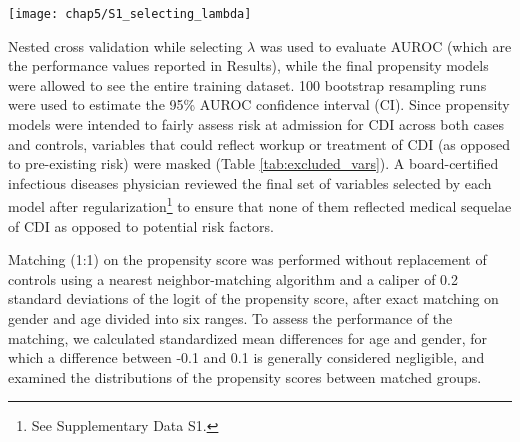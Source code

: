 \begin{figure*}[tbp]
  \centering
  \texttt{[image: chap5/S1\_selecting\_lambda]}
\end{figure*}
Nested cross validation while selecting $\lambda$ was used to evaluate AUROC (which are the performance values reported in Results), while the final propensity models were allowed to see the entire training dataset. 100 bootstrap resampling runs were used to estimate the 95\% AUROC confidence interval (CI). Since propensity models were intended to fairly assess risk at admission for CDI across both cases and controls, variables that could reflect workup or treatment of CDI (as opposed to pre-existing risk) were masked (Table \ref{tab:excluded_vars}). A board-certified infectious diseases physician reviewed the final set of variables selected by each model after regularization\footnote{See Supplementary Data S1.} to ensure that none of them reflected medical sequelae of CDI as opposed to potential risk factors.

Matching (1:1) on the propensity score was performed without replacement of controls using a nearest neighbor-matching algorithm and a caliper of 0.2 standard deviations of the logit of the propensity score,\autocite{Austin2011} after exact matching on gender and age divided into six ranges. To assess the performance of the matching, we calculated standardized mean differences\autocite{Austin2011} for age and gender, for which a difference between -0.1 and 0.1 is generally considered negligible,\autocite{Haukoos2015} and examined the distributions of the propensity scores between matched groups.

